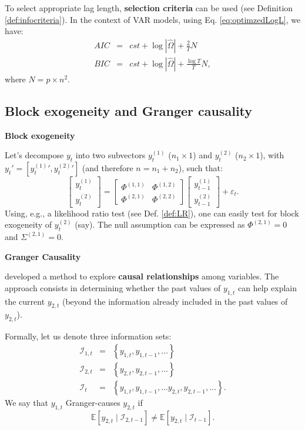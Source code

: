 \documentclass[
]{book}
\theoremstyle{definition}
\theoremstyle{definition}
\theoremstyle{definition}
\theoremstyle{definition}
\theoremstyle{remark}
\begin{document}
To select appropriate lag length, \textbf{selection criteria} can be used (see Definition \ref{def:infocriteria}). In the context of VAR models, using Eq. \eqref{eq:optimzedLogL}, we have:
\begin{eqnarray*}
AIC & = & cst + \log\left|\hat{\Omega}\right|+\frac{2}{T}N\\
BIC & = & cst + \log\left|\hat{\Omega}\right|+\frac{\log T}{T}N,
\end{eqnarray*}
where \(N=p \times n^{2}\).

\hypertarget{BlockGranger}{%
\subsection{Block exogeneity and Granger causality}\label{BlockGranger}}

\textbf{Block exogeneity}

Let's decompose \(y_t\) into two subvectors \(y^{(1)}_{t}\) (\(n_1 \times 1\)) and \(y^{(2)}_{t}\) (\(n_2 \times 1\)), with \(y_t' = [{y^{(1)}_{t}}',{y^{(2)}_{t}}']\) (and therefore \(n=n_1 +n_2\)), such that:
\[
\left[
\begin{array}{c}
y^{(1)}_{t}\\
y^{(2)}_{t}
\end{array}
\right] = \left[
\begin{array}{cc}
\Phi^{(1,1)} & \Phi^{(1,2)}\\
\Phi^{(2,1)} & \Phi^{(2,2)}
\end{array}
\right]
\left[
\begin{array}{c}
y^{(1)}_{t-1}\\
y^{(2)}_{t-1}
\end{array}
\right] + \varepsilon_t.
\]
Using, e.g., a likelihood ratio test (see Def. \ref{def:LR}), one can easily test for block exogeneity of \(y_t^{(2)}\) (say). The null assumption can be expressed as \(\Phi^{(2,1)}=0\) and \(\Sigma^{(2,1)}=0\).

\textbf{Granger Causality}

\citet{Granger_1969} developed a method to explore \textbf{causal relationships} among variables. The approach consists in determining whether the past values of \(y_{1,t}\) can help explain the current \(y_{2,t}\) (beyond the information already included in the past values of \(y_{2,t}\)).

Formally, let us denote three information sets:
\begin{eqnarray*}
\mathcal{I}_{1,t} & = & \left\{ y_{1,t},y_{1,t-1},\ldots\right\} \\
\mathcal{I}_{2,t} & = & \left\{ y_{2,t},y_{2,t-1},\ldots\right\} \\
\mathcal{I}_{t} & = & \left\{ y_{1,t},y_{1,t-1},\ldots y_{2,t},y_{2,t-1},\ldots\right\}.
\end{eqnarray*}
We say that \(y_{1,t}\) Granger-causes \(y_{2,t}\) if
\[
\mathbb{E}\left[y_{2,t}\mid \mathcal{I}_{2,t-1}\right]\neq \mathbb{E}\left[y_{2,t}\mid \mathcal{I}_{t-1}\right].
\]
\end{document}
